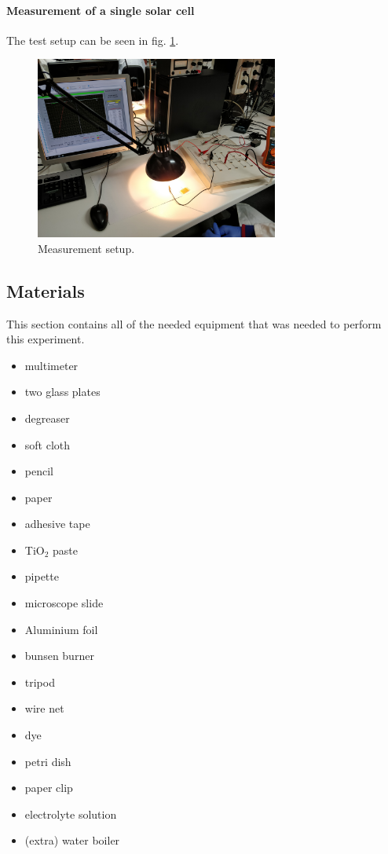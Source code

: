 \documentclass[conference]{IEEEtran}
\begin{document}
\paragraph{Measurement of a single solar cell}
The test setup can be seen in fig. \ref{fig:cellmeasurement}.

\begin{figure}[H]
\centering
\includegraphics[width=8.0cm]{CellMeasurement.jpg}
\caption{Measurement setup.}
\label{fig:cellmeasurement} %
\end{figure}

\subsection{Materials}
This section contains all of the needed equipment that was needed to perform this experiment.\\
\begin{itemize}
  \item multimeter
  \item two glass plates
  \item degreaser
  \item soft cloth
  \item pencil
  \item paper
  \item adhesive tape
  \item TiO$_2$ paste
  \item pipette
  \item microscope slide
  \item Aluminium foil
  \item bunsen burner
  \item tripod
  \item wire net
  \item dye
  \item petri dish
  \item paper clip
  \item electrolyte solution
  \item (extra) water boiler
  
\end{itemize}
\end{document}

